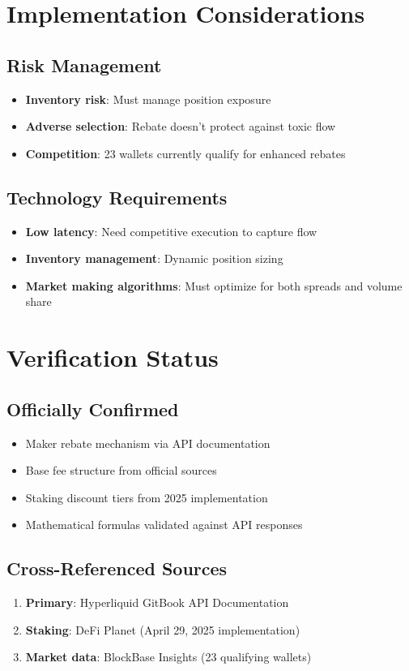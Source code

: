 \documentclass[11pt,a4paper]{article}
\begin{document}
\section{Implementation Considerations}

\subsection{Risk Management}
\begin{itemize}
    \item \textbf{Inventory risk}: Must manage position exposure
    \item \textbf{Adverse selection}: Rebate doesn't protect against toxic flow
    \item \textbf{Competition}: 23 wallets currently qualify for enhanced rebates
\end{itemize}

\subsection{Technology Requirements}
\begin{itemize}
    \item \textbf{Low latency}: Need competitive execution to capture flow
    \item \textbf{Inventory management}: Dynamic position sizing
    \item \textbf{Market making algorithms}: Must optimize for both spreads and volume share
\end{itemize}

\section{Verification Status}

\subsection{Officially Confirmed}
\begin{itemize}
    \item Maker rebate mechanism via API documentation
    \item Base fee structure from official sources
    \item Staking discount tiers from 2025 implementation
    \item Mathematical formulas validated against API responses
\end{itemize}

\subsection{Cross-Referenced Sources}
\begin{enumerate}
    \item \textbf{Primary}: Hyperliquid GitBook API Documentation
    \item \textbf{Staking}: DeFi Planet (April 29, 2025 implementation)
    \item \textbf{Market data}: BlockBase Insights (23 qualifying wallets)
\end{enumerate}
\end{document}
